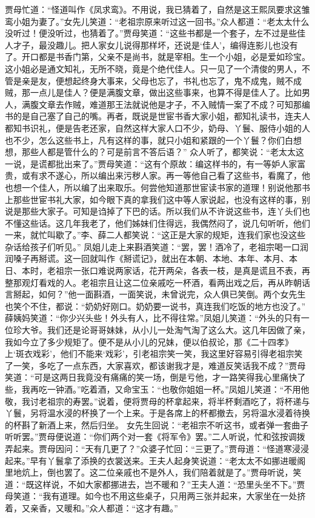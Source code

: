 \documentclass[12pt,oneside]{book}
\begin{document}
贾母忙道：“怪道叫作《凤求鸾》。不用说，我已猜着了，自然是这王熙凤要求这雏鸾小姐为妻了。”女先儿笑道：“老祖宗原来听过这一回书。”众人都道：“老太太什么没听过！便没听过，也猜着了。”贾母笑道：“这些书都是一个套子，左不过是些佳人才子，最没趣儿。把人家女儿说得那样坏，还说是‘佳人’，编得连影儿也没有了。开口都是书香门第，父亲不是尚书，就是宰相。生一个小姐，必是爱如珍宝。这小姐必是通文知礼，无所不晓，竟是个绝代佳人。只一见了一个清俊的男人，不管是亲是友，便想起终身大事来，父母也忘了，书礼也忘了，鬼不成鬼，贼不成贼，那一点儿是佳人？便是满腹文章，做出这些事来，也算不得是佳人了。比如男人，满腹文章去作贼，难道那王法就说他是才子，不入贼情一案了不成？可知那编书的是自己塞了自己的嘴。再者，既说是世宦书香大家小姐，都知礼读书，连夫人都知书识礼，便是告老还家，自然这样大家人口不少，奶母、丫鬟、服侍小姐的人也不少，怎么这些书上，凡有这样的事，就只小姐和紧跟的一个丫鬟？你们白想想，那些人都是管什么的？可是前言不答后语？”
众人听了，都笑说：“老太太这一说，是谎都批出来了。”贾母笑道：“这有个原故：编这样书的，有一等妒人家富贵，或有求不遂心，所以编出来污秽人家。再一等他自己看了这些书，看魔了，他也想一个佳人，所以编了出来取乐。何尝他知道那世宦读书家的道理！别说他那书上那些世宦书礼大家，如今眼下真的拿我们这中等人家说起，也没有这样的事，别说是那些大家子。可知是诌掉了下巴的话。所以我们从不许说这些书，连丫头们也不懂这些话。这几年我老了，他们姊妹们住得远，我偶然闷了，说几句听听，他们一来，就忙叫歇了。”李、薛二人都笑说：“这正是大家的规矩，连我们家也没这些杂话给孩子们听见。”
凤姐儿走上来斟酒笑道：“罢，罢！酒冷了，老祖宗喝一口润润嗓子再掰谎。这一回就叫作《掰谎记》，就出在本朝、本地、本年、本月、本日、本时，老祖宗一张口难说两家话，花开两朵，各表一枝，是真是谎且不表，再整那观灯看戏的人。老祖宗且让这二位亲戚吃一杯酒，看两出戏之后，再从昨朝话言掰起，如何？”他一面斟酒，一面笑说，未曾说完，众人俱已笑倒。两个女先生也笑个不住，都说：“奶奶好刚口。奶奶要一说书，真连我们吃饭的地方也没了。”
薛姨妈笑道：“你少兴头些！外头有人，比不得往常。”凤姐儿笑道：“外头的只有一位珍大爷。我们还是论哥哥妹妹，从小儿一处淘气淘了这么大。这几年因做了亲，我如今立了多少规矩了。便不是从小儿的兄妹，便以伯叔论，那《二十四孝》上‘斑衣戏彩’，他们不能来‘戏彩’，引老祖宗笑一笑，我这里好容易引得老祖宗笑了一笑，多吃了一点东西，大家喜欢，都该谢我才是，难道反笑话我不成？”贾母笑道：“可是这两日我竟没有痛痛的笑一场，倒是亏他，才一路笑得我心里痛快了些，我再吃一钟酒。”吃着酒，又命宝玉：“也敬你姐姐一杯。”凤姐儿笑道：“不用他敬，我讨老祖宗的寿罢。”说着，便将贾母的杯拿起来，将半杯剩酒吃了，将杯递与丫鬟，另将温水浸的杯换了一个上来。于是各席上的杯都撤去，另将温水浸着待换的杯斟了新酒上来，然后归坐。
女先生回说：“老祖宗不听这书，或者弹一套曲子听听罢。”贾母便说道：“你们两个对一套《将军令》罢。”二人听说，忙和弦按调拨弄起来。贾母因问：“天有几更了？”众婆子忙回：“三更了。”贾母道：“怪道寒浸浸起来。”早有丫鬟拿了添换的衣裳送来。王夫人起身笑说道：“老太太不如挪进暖阁里地炕上，倒也罢了。这二位亲戚也不是外人，我们陪着就是了。”贾母听说，笑道：“既这样说，不如大家都挪进去，岂不暖和？”王夫人道：“恐里头坐不下。”贾母笑道：“我有道理。如今也不用这些桌子，只用两三张并起来，大家坐在一处挤着，又亲香，又暖和。”众人都道：“这才有趣。”
\end{document}
